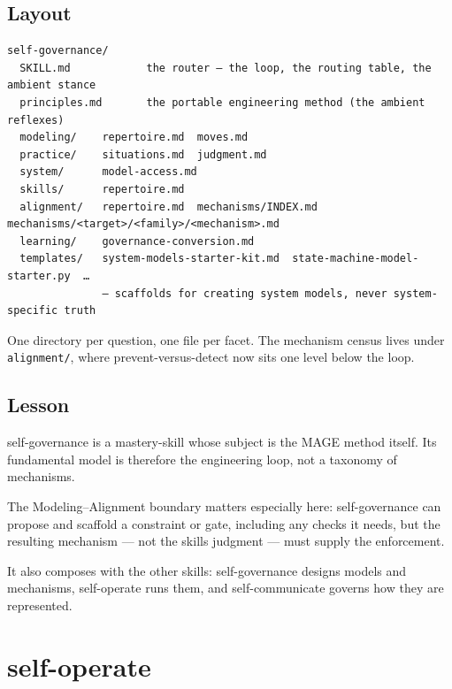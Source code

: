 \subsection{Layout}\label{heading:layout-1}

\begin{verbatim}
self-governance/
  SKILL.md            the router — the loop, the routing table, the ambient stance
  principles.md       the portable engineering method (the ambient reflexes)
  modeling/    repertoire.md  moves.md
  practice/    situations.md  judgment.md
  system/      model-access.md
  skills/      repertoire.md
  alignment/   repertoire.md  mechanisms/INDEX.md  mechanisms/<target>/<family>/<mechanism>.md
  learning/    governance-conversion.md
  templates/   system-models-starter-kit.md  state-machine-model-starter.py  …
               — scaffolds for creating system models, never system-specific truth
\end{verbatim}

One directory per question, one file per facet. The mechanism census lives under \texttt{alignment/}, where prevent-versus-detect now sits one level below the loop.

\subsection{Lesson}\label{heading:lesson-1}

self-governance is a mastery-skill whose subject is the MAGE method itself. Its fundamental model is therefore the engineering loop, not a taxonomy of mechanisms.

The Modeling--Alignment boundary matters especially here: self-governance can propose and scaffold a constraint or gate, including any checks it needs, but the resulting mechanism --- not the skill\textquotesingle s judgment --- must supply the enforcement.

It also composes with the other skills: self-governance designs models and mechanisms, self-operate runs them, and self-communicate governs how they are represented.

\section{self-operate}\label{heading:self-operate}


